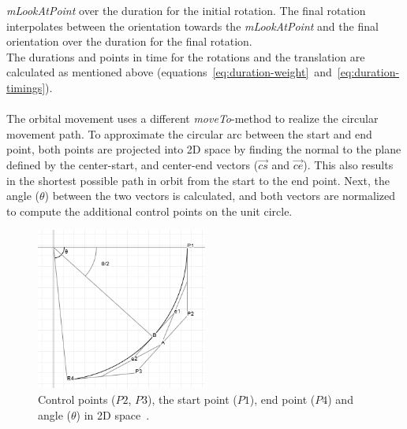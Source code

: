 \textit{mLookAtPoint} over the duration for the initial rotation.
The final rotation interpolates between the orientation towards the \textit{mLookAtPoint} and the final orientation
over the duration for the final rotation.
\\
The durations and points in time for the rotations and the translation are calculated as mentioned above
(equations~\ref{eq:duration-weight}~and~\ref{eq:duration-timings}).
\\
\\
The orbital movement uses a different \textit{moveTo}-method to realize the circular movement path.
To approximate the circular arc between the start and end point, both points are projected into 2D space by finding
the normal to the plane defined by the center-start, and center-end vectors ($\overrightarrow{cs}$ and
$\overrightarrow{ce}$).
This also results in the shortest possible path in orbit from the start to the end point.
Next, the angle ($\theta$) between the two vectors is calculated, and both vectors are normalized to compute the
additional control points on the unit circle.

\begin{figure}[h]
    \centering
    \includegraphics[width=0.5\textwidth]{content/4_3_autoNavigation/img/CircularCurveParameters}
    \caption{Control points ($P2$, $P3$), the start point ($P1$), end point ($P4$) and angle ($\theta$) in 2D
    space~\cite{Poxmax2021}.}
    \label{fig:orbital-control-points}
\end{figure}

